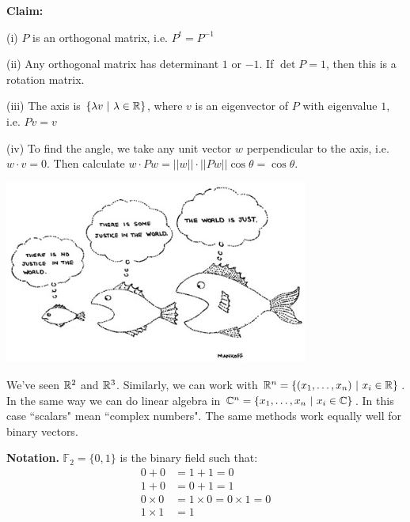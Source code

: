 \documentclass[10pt]{scrartcl}
\begin{document}
\textbf{Claim:}

(i) $P$ is an orthogonal matrix, i.e. $P^t = P^{-1}$

(ii) Any orthogonal matrix has determinant $1$ or $-1$. If $\det P = 1$, then this is a rotation matrix. 

(iii) The axis is $\{\lambda v ~|~ \lambda \in\mathbb{R}\}$, where $v$ is an eigenvector of $P$ with eigenvalue $1$, i.e. $Pv = v$

(iv) To find the angle, we take any unit vector $w$ perpendicular to the axis, i.e. $w \cdot v = 0$. Then calculate $w \cdot Pw = ||w||\cdot||Pw||\cos\theta = \cos\theta$. 



\vspace*{2cm}

\begin{center}
\includegraphics[width=10cm]{cartoon4.png}
\end{center}









	



We've  seen $\mathbb{R}^2$ and $\mathbb{R}^3$. Similarly, we can work with $\mathbb{R}^n = \{(x_1,\dots,x_n)~|~ x_i\in\mathbb{R}\}$. In the same way we can do linear algebra in $\mathbb{C}^n = \{x_1,\dots,x_n ~|~ x_i \in\mathbb{C}\}$. In this case ``scalars" mean ``complex numbers". The same methods work equally well for binary vectors. 

\textbf{Notation.} $\mathbb{F}_2 = \{0,1\}$ is the binary field such that:
\begin{align*}
  0 + 0 &= 1 + 1 = 0\\
  1 + 0 &= 0 + 1 = 1\\
  0 \times 0 &= 1 \times 0 = 0 \times 1 = 0\\
  1 \times 1 &= 1
\end{align*}
\end{document}
